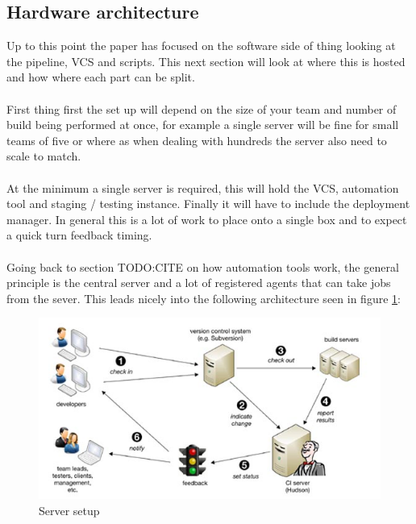 \subsection{Hardware architecture}

Up to this point the paper has focused on the software side of thing looking at the pipeline, VCS and scripts. This next section will look at where this is hosted and how where each part can be split.  
\\\\
First thing first the set up will depend on the size of your team and number of build being performed at once, for example a single server will be fine for small teams of five or where as when dealing with hundreds the server also need to scale to match.
\\\\
At the minimum a single server is required, this will hold the VCS, automation tool and staging / testing instance. Finally it will have to include the deployment manager. In general this is a lot of work to place onto a single box and to expect a quick turn feedback timing.
\\\\
Going back to section TODO:CITE on how automation tools work, the general principle is the central server and a lot of registered agents that can take jobs from the sever. This leads nicely into the following architecture seen in figure \ref{fig:bamboo}:

\begin{figure}[H]
	\centering
	\includegraphics[scale=2.5]{images/bamboo.jpg}
	\caption{Server setup \cite{bamboo}}
	\label{fig:bamboo}
\end{figure}

